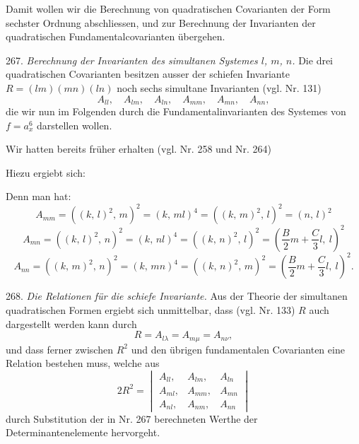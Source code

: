 Damit wollen wir die Berechnung von quadratischen Covarianten der Form sechster Ordnung abschliessen, und zur Berechnung der Invarianten der quadratischen Fundamentalcovarianten übergehen.

267. \textit{Berechnung der Invarianten des simultanen Systemes $l$, $m$, $n$.} Die drei quadratischen Covarianten besitzen ausser der schiefen Invariante $R=(lm)(mn)(ln)$ noch sechs simultane Invarianten (vgl. Nr. 131)
\[
A_{ll},\quad A_{lm},\quad A_{ln},\quad A_{mm},\quad A_{mn},\quad A_{nn},
\]
die wir nun im Folgenden durch die Fundamentalinvarianten des Systemes von $f=a_x^6$ darstellen wollen.

Wir hatten bereits früher erhalten (vgl. Nr. 258 und Nr. 264)

Hiezu ergiebt sich:

Denn man hat:
\[
A_{mm}=((k,\,l)^2,\,m)^2=(k,\,ml)^4=((k,\,m)^2,\,l)^2=(n,\,l)^2
\]
\[
A_{mn}=((k,\,l)^2,\,n)^2=(k,\,nl)^4=((k,\,n)^2,\,l)^2=\left(\frac{B}{2}m+\frac{C}{3}l,\ l\right)^2
\]
\[
A_{nn}=((k,\,m)^2,\,n)^2=(k,\,mn)^4=((k,\,n)^2,\,m)^2=\left(\frac{B}{2}m+\frac{C}{3}l,\ l\right)^2.
\]



268. \textit{Die Relationen für die schiefe Invariante.} Aus der Theorie der simultanen quadratischen Formen ergiebt sich unmittelbar, dass (vgl. Nr. 133) $R$ auch dargestellt werden kann durch
\[
R=A_{l\lambda}=A_{m\mu}=A_{n\nu},
\]
und dass ferner zwischen $R^2$ und den übrigen fundamentalen Covarianten eine Relation bestehen muss, welche aus
\[
2R^2=\begin{vmatrix} A_{ll}, & A_{lm}, & A_{ln} \\ A_{ml}, & A_{mm}, & A_{mn} \\ A_{nl}, & A_{nm}, & A_{nn} \end{vmatrix}
\]
durch Substitution der in Nr. 267 berechneten Werthe der Determinantenelemente hervorgeht.


